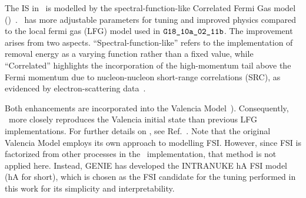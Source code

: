     The IS in \gZero\ is modelled by the spectral-function-like Correlated Fermi Gas model (\sfcfg)~\cite{sfcfg-talk,sfcfg-GitHubCommit,GENIE:2021npt}. 
    \sfcfg\ has more adjustable parameters for tuning and improved physics compared to the local fermi gas (LFG) model used in $\texttt{G18\_10a\_02\_11b}$.
    The improvement arises from two aspects. 
    ``Spectral-function-like'' refers to the implementation of removal energy as a varying function rather than a fixed value, while ``Correlated'' highlights the incorporation of the high-momentum tail above the Fermi momentum due to nucleon-nucleon short-range correlations (SRC), as evidenced by electron-scattering data~\cite{CLAS:2005ola}.

    Both enhancements are incorporated into the Valencia Model~\cite{Nieves:2004wx}).  
    Consequently, \sfcfg\ more closely reproduces the Valencia initial state than previous LFG implementations.  
    For further details on \sfcfg, see Ref.~\cite{GENIE:2021npt}.  
    Note that the original Valencia Model employs its own approach to modelling FSI. 
    However, since FSI is factorized from other processes in the \genie\ implementation, that method is not applied here.  
    Instead, GENIE has developed the INTRANUKE hA FSI model (hA for short), which is chosen as the FSI candidate for the tuning performed in this work for its simplicity and interpretability.

